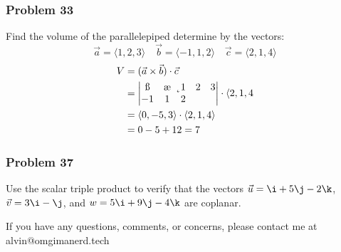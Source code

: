 \documentclass[letterpaper, 12pt]{math}
\begin{document}
\subsubsection*{Problem 33}
Find the volume of the parallelepiped determine by the vectors:
\[ \vec{a} = \langle1,2,3\rangle \quad \vec{b} = \langle-1,1,2\rangle
  \quad \vec{c} = \langle2,1,4\rangle \]
\begin{align*}
  V &= (\vec{a}\times\vec{b})\cdot\vec{c} \\
  &= \begin{vmatrix}
    \i & \j & \k \\
    1 & 2 & 3 \\
    -1 & 1 & 2
  \end{vmatrix}\cdot\langle2,1,4 \\
  &= \langle0,-5,3\rangle\cdot\langle2,1,4\rangle \\
  &= 0-5+12 = 7
\end{align*}

\subsubsection*{Problem 37}
Use the scalar triple product to verify that the vectors \( \vec{u} = \i+5\j-
2\k \), \( \vec{v} = 3\i-\j \), and \( w = 5\i+9\j-4\k \) are coplanar.

\begin{center}
  If you have any questions, comments, or concerns, please contact me at
  alvin@omgimanerd.tech
\end{center}
\end{document}

